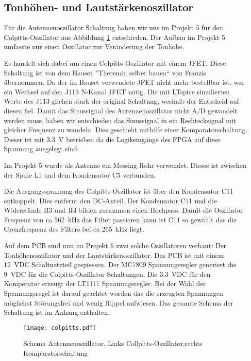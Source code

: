 \subsection{Tonhöhen- und Lautstärkenoszillator}\label{subsec:Antennenoszilator}
Für die Antennenoszillator Schaltung haben wir uns im Projekt 5 für den Colpitts-Oszillator aus Abbildung \ref{img:colpitts} entschieden. Der Aufbau im Projekt 5 umfasste nur einen Oszillator zur Veränderung der Tonhöhe.

Es handelt sich dabei um einen Colpitts-Oszillator mit einem JFET. Diese Schaltung ist von dem Bauset ''Theremin selber bauen`` von Franzis übernommen. 
Da der im Bauset verwendete JFET nicht mehr bestellbar ist, war ein Wechsel auf den J113 N-Kanal JFET nötig. Die mit LTspice simulierten Werte des J113 glichen stark der original Schaltung, weshalb der Entscheid auf diesen fiel. 
Damit das Sinussignal des Antennenoszillator nicht A/D gewandelt werden muss, haben wir entschieden das Sinussignal in ein Rechtecksignal mit gleicher Frequenz zu wandeln. Dies geschieht mithilfe einer Komparatorschaltung. 
Dieser ist mit \SI{3.3}{V} betrieben da die Logikeingänge des FPGA auf diese Spannung ausgelegt sind. 

Im Projekt 5 wurde als Antenne ein Messing Rohr verwendet. Dieses ist zwischen der Spule L1 und dem Kondensator C5 verbunden. 

Die Ausgangsspannung des Colpitts-Oszillator ist über den Kondensator C11 entkoppelt. Dies entfernt den DC-Anteil. Der Kondensator C11 und die Widerstände R3 und R4 bilden zusammen einen Hochpass. Damit die Oszillator Frequenz von ca \SI{562}{kHz} das Filter passieren kann ist C11 so gewählt das die Grenzfrequenz des Filters bei ca \SI{265}{kHz} liegt. 

Auf dem PCB sind nun im Projekt 6 zwei solche Oszillatoren verbaut: Der Tonhöhenoszillator und der Lautstärkenoszillator. Das PCB ist mit einem \SI{12} {VDC} Schaltnetzteil gespiessen. Der MC7809 Spannungsregler generiert die \SI{9} {VDC} für die Colpitts-Oszillator Schaltungen. Die \SI{3.3} {VDC} für den Komperator erzeugt der LT1117 Spannungsregler. Bei der Wahl der Spannungsregel ist darauf geachtet worden das die erzeugten Spannungen möglichst Störungsfrei und wenig Rippel aufwiesen. Das gesamte Schema der Schaltung ist im Anhang enthalten.

\begin{figure}[h]
	\centering
	\texttt{[image: colpitts.pdf]}
	\caption{Schema Antennenoszillator. Links Collpitts-Oszillator,rechts Komparatorschaltung}
	\label{img:colpitts}
\end{figure} 

\clearpage


